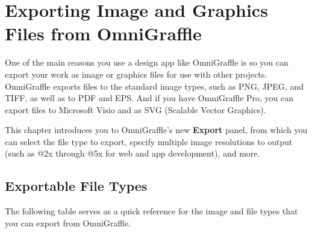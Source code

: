 \documentclass[../main.tex]{subfiles}
\begin{document}
\chapter{Exporting Image and Graphics Files from OmniGraffle}

One of the main reasons you use a design app like OmniGraffle is so you can export your work as
image or graphics files for use with other projects. OmniGraffle exports files to the standard
image types, such as PNG, JPEG, and TIFF, as well as to PDF and EPS. And if you have
OmniGraffle Pro, you can export files to Microsoft Visio and as SVG (Scalable Vector
Graphics).

This chapter introduces you to OmniGraffle's new \textbf{Export} panel, from which you can
select the file type to export, specify multiple image resolutions to output (such as @2x
through @5x for web and app development), and more.

\section{Exportable File Types}

The following table serves as a quick reference for the image and file types that you can export
from OmniGraffle.
\end{document}
